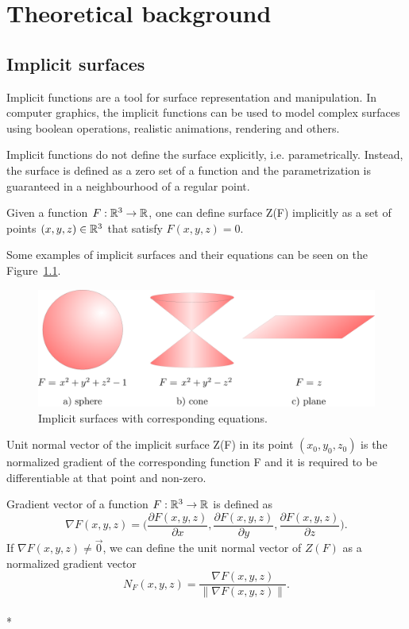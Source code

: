 \chapter{Theoretical background}
\label{chap1} %

\section{Implicit surfaces}
\label{sub2.1}

Implicit functions are a tool for surface representation and manipulation.
In computer graphics, the implicit functions can be used to model complex surfaces
using boolean operations, realistic animations, rendering and others.

Implicit functions do not define the surface explicitly, i.e. parametrically. 
Instead, the surface is defined as a zero set of a function and the parametrization 
is guaranteed in a neighbourhood of a regular point. 
\begin{definition}
    Given a function $F: \mathbb{R}^3 \to \mathbb{R}$, one can define surface Z(F) implicitly
    as a set of points $(x, y, z)\in \mathbb{R}^3$ that satisfy $F(x, y, z) = 0$.
\end{definition}

Some examples of implicit surfaces and their equations can be seen on
the Figure~\ref{img:1}.

\begin{figure}
    \centerline{\includegraphics[scale=0.5]{images/img1}}
    \caption[Implicit surfaces with corresponding equations]
    {Implicit surfaces with corresponding equations.}
    \label{img:1}
\end{figure}

Unit normal vector of the implicit surface Z(F) in its point $(x_0, y_0, z_0)$ is
the normalized gradient of the corresponding function F and it is required to be 
differentiable at that point and non-zero.

\begin{definition}
    Gradient vector of a function $F:\mathbb{R}^3 \to \mathbb{R}$ is defined as 
    $$\nabla F(x, y, z) = \bigg(\frac{\partial F(x, y, z)}{\partial x}, \frac{\partial F(x, y, z)}{\partial y}, 
    \frac{\partial F(x, y, z)}{\partial z}\bigg).$$
    If $\nabla F(x,y,z) \neq \vec{0}$, we can define the unit normal vector of $Z(F)$ as 
    a normalized gradient vector
    $$N_F(x, y, z)  = \frac{\nabla F(x, y, z)}{\| \nabla F(x, y, z) \|}.$$
    \\*
\end{definition}

